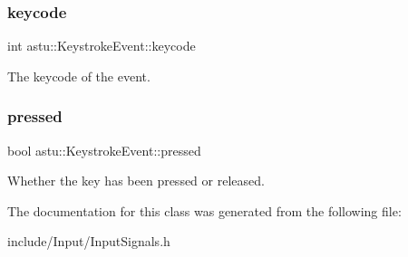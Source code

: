\subsubsection{\texorpdfstring{keycode}{keycode}}
{\footnotesize\ttfamily int astu\+::\+Keystroke\+Event\+::keycode}

The keycode of the event. \mbox{\label{classastu_1_1KeystrokeEvent_aa1623c59df97fda83abf305ee1a36cb9}} 
\subsubsection{\texorpdfstring{pressed}{pressed}}
{\footnotesize\ttfamily bool astu\+::\+Keystroke\+Event\+::pressed}

Whether the key has been pressed or released. 

The documentation for this class was generated from the following file\+:\begin{DoxyCompactItemize}
\item 
include/\+Input/Input\+Signals.\+h\end{DoxyCompactItemize}
